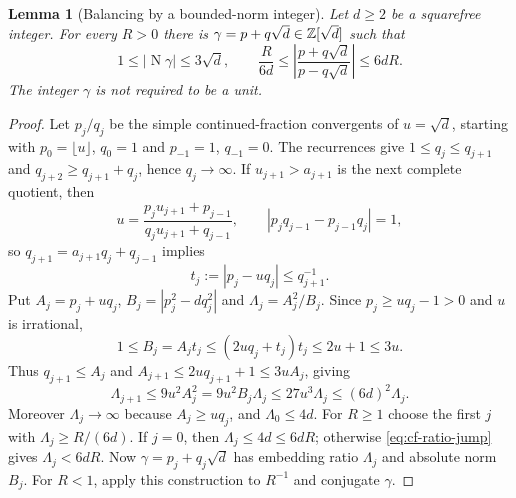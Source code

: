 \documentclass[11pt,reqno]{amsart}
\newtheorem{lemma}[theorem]{Lemma}
\theoremstyle{definition}
\theoremstyle{remark}
\numberwithin{equation}{section}
\newcommand{\Nm}{\operatorname{N}}
\begin{document}
\begin{lemma}[Balancing by a bounded-norm integer]\label{lem:A3boundedbalance}
Let $d\ge2$ be a squarefree integer. For every $R>0$ there is
$\gamma=p+q\sqrt d\in\mathbb Z[\sqrt d]$ such that
\[
 1\le |\Nm\gamma|\le3\sqrt d,
 \qquad
 \frac{R}{6d}\le
 \left|\frac{p+q\sqrt d}{p-q\sqrt d}\right|\le6dR.
\]
The integer $\gamma$ is not required to be a unit.
\end{lemma}
\begin{proof}
Let $p_j/q_j$ be the simple continued-fraction convergents of $u=\sqrt d$,
starting with $p_0=\lfloor u\rfloor$, $q_0=1$ and $p_{-1}=1$, $q_{-1}=0$.
The recurrences give $1\le q_j\le q_{j+1}$ and
$q_{j+2}\ge q_{j+1}+q_j$, hence $q_j\to\infty$. If $u_{j+1}>a_{j+1}$
is the next complete quotient, then
\[
 u=\frac{p_ju_{j+1}+p_{j-1}}{q_ju_{j+1}+q_{j-1}},\qquad
 |p_jq_{j-1}-p_{j-1}q_j|=1,
\]
so $q_{j+1}=a_{j+1}q_j+q_{j-1}$ implies
\begin{equation}
 t_j:=|p_j-uq_j|\le q_{j+1}^{-1}.                 \label{eq:cf-error}
\end{equation}
Put $A_j=p_j+uq_j$, $B_j=|p_j^2-dq_j^2|$ and $\Lambda_j=A_j^2/B_j$.
Since $p_j\ge uq_j-1>0$ and $u$ is irrational,
\begin{equation}
 1\le B_j=A_jt_j\le(2uq_j+t_j)t_j\le2u+1\le3u. \label{eq:cf-norm}
\end{equation}
Thus $q_{j+1}\le A_j$ and $A_{j+1}\le2uq_{j+1}+1\le3uA_j$, giving
\begin{equation}
 \Lambda_{j+1}\le9u^2A_j^2
 =9u^2B_j\Lambda_j\le27u^3\Lambda_j
 \le(6d)^2\Lambda_j.                            \label{eq:cf-ratio-jump}
\end{equation}
Moreover $\Lambda_j\to\infty$ because $A_j\ge uq_j$, and
$\Lambda_0\le4d$. For $R\ge1$ choose the first $j$ with
$\Lambda_j\ge R/(6d)$. If $j=0$, then $\Lambda_j\le4d\le6dR$;
otherwise \eqref{eq:cf-ratio-jump} gives $\Lambda_j<6dR$.
Now $\gamma=p_j+q_j\sqrt d$ has embedding ratio $\Lambda_j$ and
absolute norm $B_j$. For $R<1$, apply this construction to $R^{-1}$
and conjugate $\gamma$.
\end{proof}
\end{document}
